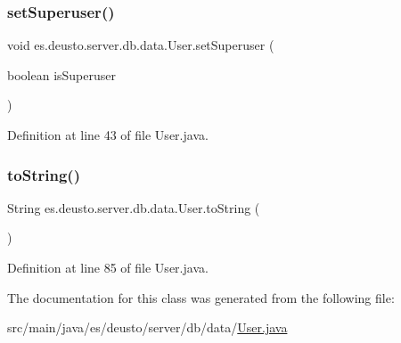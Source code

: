 \subsubsection{\texorpdfstring{set\+Superuser()}{setSuperuser()}}
{\footnotesize\ttfamily void es.\+deusto.\+server.\+db.\+data.\+User.\+set\+Superuser (\begin{DoxyParamCaption}\item[{boolean}]{is\+Superuser }\end{DoxyParamCaption})}



Definition at line 43 of file User.\+java.

\mbox{\label{classes_1_1deusto_1_1server_1_1db_1_1data_1_1_user_a494980951c4c71c0a793994b7bcd5101}} 
\subsubsection{\texorpdfstring{to\+String()}{toString()}}
{\footnotesize\ttfamily String es.\+deusto.\+server.\+db.\+data.\+User.\+to\+String (\begin{DoxyParamCaption}{ }\end{DoxyParamCaption})}



Definition at line 85 of file User.\+java.



The documentation for this class was generated from the following file\+:\begin{DoxyCompactItemize}
\item 
src/main/java/es/deusto/server/db/data/\hyperlink{_user_8java}{User.\+java}\end{DoxyCompactItemize}
